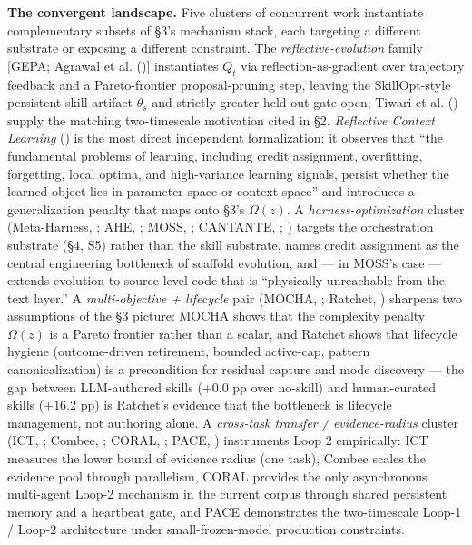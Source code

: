 \documentclass[
]{article}
\begin{document}
\textbf{The convergent landscape.} Five clusters of concurrent work
instantiate complementary subsets of §3's mechanism stack, each
targeting a different substrate or exposing a different constraint. The
\emph{reflective-evolution} family {[}GEPA; Agrawal et al.
(){]} instantiates \(Q_t\) via
reflection-as-gradient over trajectory feedback and a Pareto-frontier
proposal-pruning step, leaving the SkillOpt-style persistent skill
artifact \(\theta_s\) and strictly-greater held-out gate open; Tiwari et
al. () supply the matching
two-timescale motivation cited in §2. \emph{Reflective Context Learning}
() is the most
direct independent formalization: it observes that ``the fundamental
problems of learning, including credit assignment, overfitting,
forgetting, local optima, and high-variance learning signals, persist
whether the learned object lies in parameter space or context space''
and introduces a generalization penalty that maps onto §3's
\(\Omega(z)\). A \emph{harness-optimization} cluster (Meta-Harness,
; AHE,
; MOSS,
; CANTANTE,
;
) targets the
orchestration substrate (§4, S5) rather than the skill substrate, names
credit assignment as the central engineering bottleneck of scaffold
evolution, and --- in MOSS's case --- extends evolution to source-level
code that is ``physically unreachable from the text layer.'' A
\emph{multi-objective + lifecycle} pair (MOCHA,
; Ratchet,
) sharpens two
assumptions of the §3 picture: MOCHA shows that the complexity penalty
\(\Omega(z)\) is a Pareto frontier rather than a scalar, and Ratchet
shows that lifecycle hygiene (outcome-driven retirement, bounded
active-cap, pattern canonicalization) is a precondition for residual
capture and mode discovery --- the gap between LLM-authored skills
(\(+0.0\) pp over no-skill) and human-curated skills (\(+16.2\) pp) is
Ratchet's evidence that the bottleneck is lifecycle management, not
authoring alone. A \emph{cross-task transfer / evidence-radius} cluster
(ICT, ; Combee,
; CORAL,
; PACE,
) instruments Loop 2
empirically: ICT measures the lower bound of evidence radius (one task),
Combee scales the evidence pool through parallelism, CORAL provides the
only asynchronous multi-agent Loop-2 mechanism in the current corpus
through shared persistent memory and a heartbeat gate, and PACE
demonstrates the two-timescale Loop-1 / Loop-2 architecture under
small-frozen-model production constraints.
\end{document}
